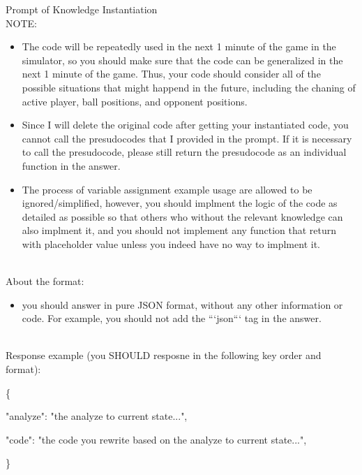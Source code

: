 \begin{gbox}{Prompt of Knowledge Instantiation}
~\\

NOTE: 
\begin{itemize}
    \item The code will be repeatedly used in the next 1 minute of the game in the simulator, so you should make sure that the code can be generalized in the next 1 minute of the game. Thus, your code should consider all of the possible situations that might happend in the future, including the chaning of active player, ball positions, and opponent positions. 
    \item Since I will delete the original code after getting your instantiated code, you cannot call the presudocodes that I provided in the prompt. If it is necessary to call the presudocode, please still return the presudocode as an individual function in the answer.
    \item The process of variable assignment example usage are allowed to be ignored/simplified, however, you should implment the logic of the code as detailed as possible so that others who without the relevant knowledge can also implment it, and you should not implement any function that return with placeholder value unless you indeed have no way to implment it.
\end{itemize}

~\\

About the format:
\begin{itemize}
    \item you should answer in pure JSON format, without any other information or code. For example, you should not add the ```json``` tag in the answer.
\end{itemize}
~\\
     
            
Response example (you SHOULD resposne in the following key order and format):

\{

\hspace{5mm} "analyze": "the analyze to current state...",   

\hspace{5mm} "code": "the code you rewrite based on the analyze to current state...",

\}

\end{gbox}



